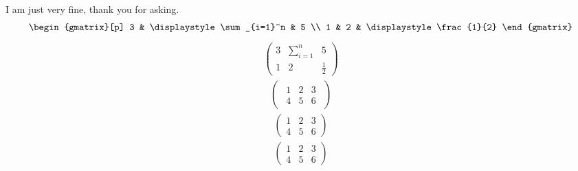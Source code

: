 \documentclass{article}
\begin{document}
I am just very fine, thank you for asking. 
\begin{align*}
  \begin{gmatrix}[p]
    3 & \displaystyle\sum_{i=1}^n & 5 \\
    1 & 2 & \displaystyle\frac{1}{2}
  \end{gmatrix}
\end{align*}
\begin{align*}
  \begin{pmatrix}
    3 & \displaystyle\sum_{i=1}^n & 5 \\
    1 & 2 & \displaystyle\frac{1}{2}
  \end{pmatrix}
\end{align*}
\begin{align*}
  \begin{pmatrix}
    \begin{array}{cc|c}
      1 & 2 & 3 \\ 
      4 & 5 & 6
    \end{array}
  \end{pmatrix}
\end{align*}
\begin{align*}
  \begin{pmatrix}
    1 & 2 & 3 \\ 
    4 & 5 & 6
  \end{pmatrix}
\end{align*}
\begin{align*}
  \left(\begin{array}{cc|c}
    1 & 2 & 3 \\ 
    4 & 5 & 6
  \end{array}
  \right)
\end{align*}
\end{document}
